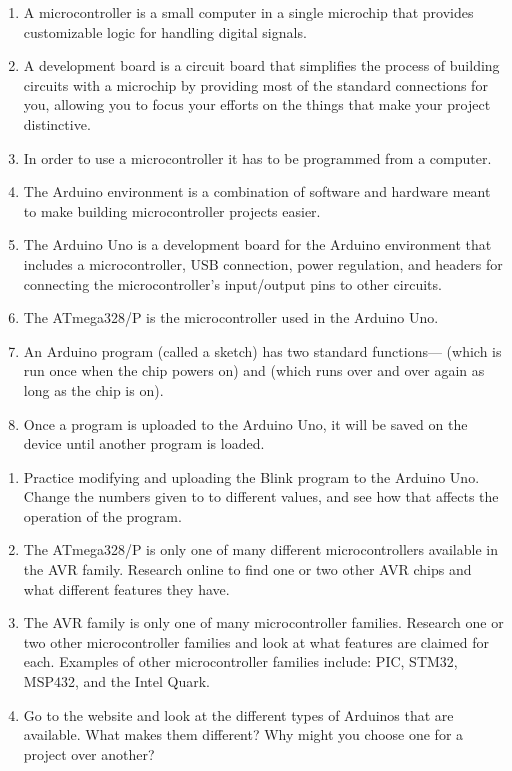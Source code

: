 \begin{enumerate}
\item A microcontroller is a small computer in a single microchip that provides customizable logic for handling digital signals.
\item A development board is a circuit board that simplifies the process of building circuits with a microchip by providing most of the standard connections for you, allowing you to focus your efforts on the things that make your project distinctive.
\item In order to use a microcontroller it has to be programmed from a computer.
\item The Arduino environment is a combination of software and hardware meant to make building microcontroller projects easier.
\item The Arduino Uno is a development board for the Arduino environment that includes a microcontroller, USB connection, power regulation, and headers for connecting the microcontroller's input/output pins to other circuits.
\item The ATmega328/P is the microcontroller used in the Arduino Uno.
\item An Arduino program (called a sketch) has two standard functions--- (which is run once when the chip powers on) and  (which runs over and over again as long as the chip is on).
\item Once a program is uploaded to the Arduino Uno, it will be saved on the device until another program is loaded.
\end{enumerate}

\applysection

\begin{enumerate}
\item Practice modifying and uploading the Blink program to the Arduino Uno.  Change the numbers given to  to different values, and see how that affects the operation of the program.
\item The ATmega328/P is only one of many different microcontrollers available in the AVR family.  Research online to find one or two other AVR chips and what different features they have.
\item The AVR family is only one of many microcontroller families.  Research one or two other microcontroller families and look at what features are claimed for each.  Examples of other microcontroller families include: PIC, STM32, MSP432, and the Intel Quark.
\item Go to the  website and look at the different types of Arduinos that are available.  What makes them different?  Why might you choose one for a project over another?
\end{enumerate}
